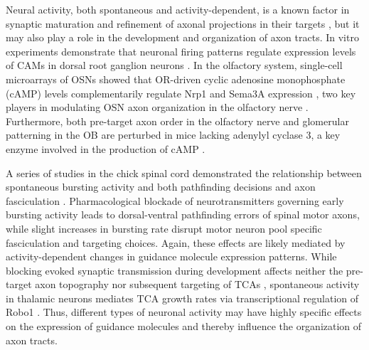 \label{sec:Intrinsic2}
Neural activity, both spontaneous and activity-dependent, is a known factor in synaptic maturation and refinement of axonal projections in their targets \cite[reviewed in][]{zhang2001electrical}, but it may also play a role in the development and organization of axon tracts.
In vitro experiments demonstrate that neuronal firing patterns regulate expression levels of CAMs in dorsal root ganglion neurons \cite{itoh1997activity}.
In the olfactory system, single-cell microarrays of OSNs showed that OR-driven cyclic adenosine monophosphate (cAMP) levels complementarily regulate Nrp1 and Sema3A expression \cite{imai2006odorant}, two key players in modulating OSN axon organization in the olfactory nerve \cite{imai2009pre}.
Furthermore, both pre-target axon order in the olfactory nerve and glomerular patterning in the OB are perturbed in mice lacking adenylyl cyclase 3, a key enzyme involved in the production of cAMP \cite{miller2010axon}.

A series of studies in the chick spinal cord demonstrated the relationship between spontaneous bursting activity and both pathfinding decisions and axon fasciculation \cite[reviewed in][]{hanson2008spontaneous}.
Pharmacological blockade of neurotransmitters governing early bursting activity leads to dorsal-ventral pathfinding errors of spinal motor axons, while slight increases in bursting rate disrupt motor neuron pool specific fasciculation and targeting choices.
Again, these effects are likely mediated by activity-dependent changes in guidance molecule expression patterns.
While blocking evoked synaptic transmission during development affects neither the pre-target axon topography nor subsequent targeting of TCAs \cite{molnar2002normal}, spontaneous activity in thalamic neurons mediates TCA growth rates via transcriptional regulation of Robo1 \cite{mire2012spontaneous}.
Thus, different types of neuronal activity may have highly specific effects on the expression of guidance molecules and thereby influence the organization of axon tracts.
